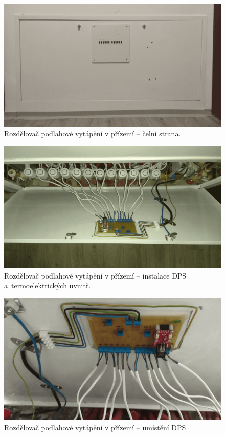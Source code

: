 \begin{figure}[H]
    \centering
    \includegraphics[width=\textwidth]{images/rozdelovac-prizemi/rozdelovac-prizemi-celni-strana.png}
    \caption{Rozdělovač podlahové vytápění v přízemí – čelní strana.}
    \label{fig:rozdelovac-prizemi-celni-strana}
\end{figure}

\begin{figure}[H]
    \centering
    \includegraphics[width=\textwidth]{images/rozdelovac-prizemi/rozdelovac-prizemi.png}
    \caption[Rozdělovač podlahové vytápění v přízemí – uvnitř]{Rozdělovač podlahové vytápění v přízemí – instalace DPS a~termoelektrických uvnitř.}
    \label{fig:rozdelovac-prizemi}
\end{figure}

\begin{figure}[H]
    \centering
    \includegraphics[width=\textwidth]{images/rozdelovac-prizemi/rozdelovac-prizemi-umisteni-dps.png}
    \caption{Rozdělovač podlahové vytápění v přízemí – umístění DPS}
    \label{fig:rozdelovac-prizemi-umisteni-dps}
\end{figure}